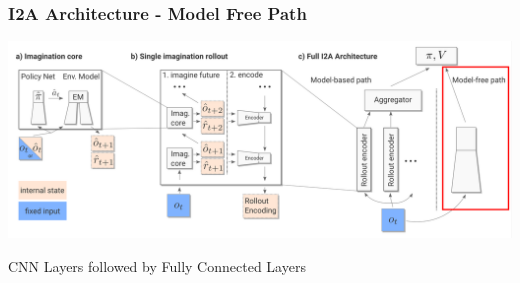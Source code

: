 \begin{frame}
    \frametitle{I2A Architecture - Model Free Path}


\includegraphics[width=\columnwidth]{./Images/i2a_all_model_free_path.png}%

\begin{PraesentationAufzaehlung}
	\item CNN Layers followed by Fully Connected Layers
\end{PraesentationAufzaehlung}

\end{frame}
\clearpage



